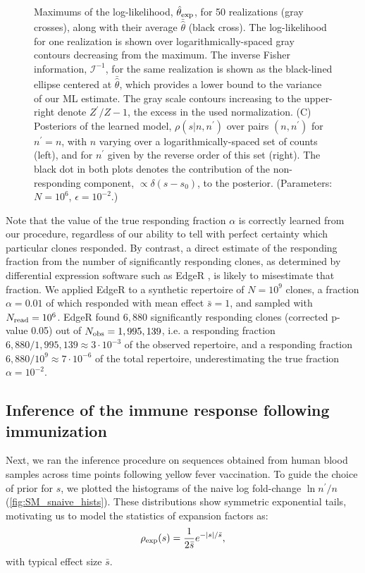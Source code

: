 \documentclass[pre,twocolumn,english,longbibliography]{revtex4}
\newcommand{\beq}{\begin{equation}}
\newcommand{\eeq}{\end{equation}}
\newcommand{\<}{\langle}
\renewcommand{\>}{\rangle}
\begin{document}
\begin{figure}
{Maximums of the log-likelihood, $\hat\theta_{\rm exp}$, for 50 realizations (gray crosses), along with their average $\bar{\hat{\theta}}$ (black cross). 
The log-likelihood for one realization is shown over logarithmically-spaced gray contours decreasing from the maximum. 
The inverse Fisher information, $\mathcal{I}^{-1}$, for the same realization is shown as the black-lined ellipse centered at $\bar{\hat{\theta}}$, which provides a lower bound to the variance of our ML estimate. 
The gray scale contours increasing to the upper-right denote $Z^\prime/Z-1$, the excess in the used normalization. (C) Posteriors of the learned model, $\rho(s|n,n^{\prime})$ over pairs $(n,n^{\prime})$ for $n^{\prime}=n$, with $n$ varying over a logarithmically-spaced set of counts (left), and for $n^{\prime}$ given by the reverse order of this set (right). The black dot in both plots denotes the contribution of the non-responding component, $\propto \delta(s-s_0)$, to the posterior.
(Parameters: $N=10^6$, $\epsilon=10^{-2}$.)
\label{fig:diffexpr_ex1}
}
\end{figure}

Note that the value of the true responding fraction $\alpha$ is correctly learned from our procedure, regardless of our ability to tell with perfect certainty which particular clones responded. By contrast, a direct estimate of the responding fraction from the number of significantly responding clones, as determined by differential expression software such as EdgeR \cite{Robinson2010}, is likely to misestimate that fraction. We applied EdgeR to a synthetic repertoire of $N=10^9$ clones, a fraction $\alpha=0.01$ of which responded with mean effect $\bar s=1$, and sampled with $N_{\rm read}=10^6$. EdgeR found $6,880$ significantly responding clones (corrected p-value 0.05) out of $N_{\rm obs}=1,995,139 $, i.e. a responding fraction $6,880/1,995,139 \approx 3\cdot 10^{-3}$ of the observed repertoire, and a responding fraction $6,880/10^9\approx 7\cdot 10^{-6}$ of the total repertoire, underestimating the true fraction $\alpha=10^{-2}$.

\subsection*{Inference of the immune response following immunization} \label{sec:diffexpr}

Next, we ran the inference procedure on sequences obtained from human blood samples across time points following yellow fever vaccination. To guide the choice of prior for $s$, we plotted the histograms of the naive log fold-change $\ln n^{\prime}/n$ (\cref{fig:SM_snaive_hists}). These distributions show symmetric exponential tails, motivating us to model the statistics of expansion factors as:
\beq\label{eq:symmexp}
\rho_{\rm exp}(s)=\frac{1}{2\bar s}e^{-|s|/\bar s},
\eeq
with typical effect size $\bar{s}$.
\end{document}

